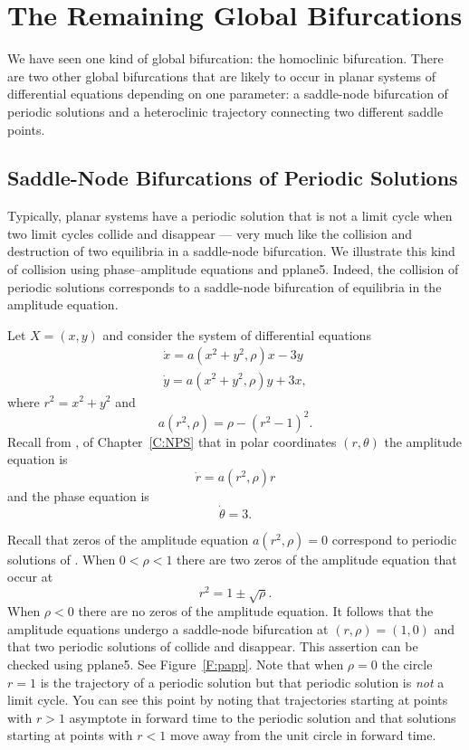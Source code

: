\section{The Remaining Global Bifurcations} 
\label{S:GlobalBif}

We have seen one kind of global bifurcation: the homoclinic bifurcation. 
There are two other global bifurcations that are likely to occur in planar 
systems of differential equations depending on one parameter:  a saddle-node
bifurcation of periodic solutions and a heteroclinic trajectory connecting two
different saddle points.

\subsection*{Saddle-Node Bifurcations of Periodic Solutions}

Typically, planar systems have a periodic solution that is not a limit cycle 
when two limit cycles collide and disappear --- very much like the collision 
and destruction of two equilibria in a saddle-node bifurcation.  We illustrate 
this kind of collision using phase--amplitude equations and {\sf pplane5}.
Indeed, the collision of periodic solutions corresponds to a saddle-node 
bifurcation of equilibria in the amplitude equation.

Let $X=(x,y)$ and consider the system of differential equations 
\begin{equation*}  \label{e:papp}
\begin{array}{rcl}
\dot{x} = a(x^2+y^2,\rho)x - 3y \\
\dot{y} = a(x^2+y^2,\rho)y + 3x,
\end{array}
\end{equation*}
where $r^2=x^2+y^2$ and
\begin{equation}  \label{e:app}  
a(r^2,\rho) = \rho - (r^2-1)^2.
\end{equation} 
Recall from , of Chapter~\ref{C:NPS}
that in polar coordinates $(r,\theta)$ the 
amplitude equation is 
\[
\dot{r} = a(r^2,\rho)r
\]
and the phase equation is
\[
\dot{\theta} = 3.
\]

Recall that zeros of the amplitude equation $a(r^2,\rho)=0$ correspond to 
periodic solutions of .  When $0<\rho<1$ there are two zeros of 
the amplitude equation  that occur at 
\[
r^2 = 1 \pm\sqrt{\rho}.
\]
When $\rho<0$ there are no zeros of the amplitude equation.  
It follows that the amplitude equations undergo a saddle-node 
bifurcation at $(r,\rho)=(1,0)$ and that two periodic solutions of 
 collide and disappear.  This assertion can be 
checked using {\sf pplane5}.  
See Figure~\ref{F:papp}. Note that when $\rho=0$
the circle $r=1$ is the trajectory of a periodic solution but that periodic 
solution is {\em not\/} a limit cycle.  You can see this point by noting that 
trajectories starting at points with $r>1$ asymptote in forward time to the 
periodic solution and that solutions starting at points with $r<1$ move away 
from the unit circle in forward time.  

